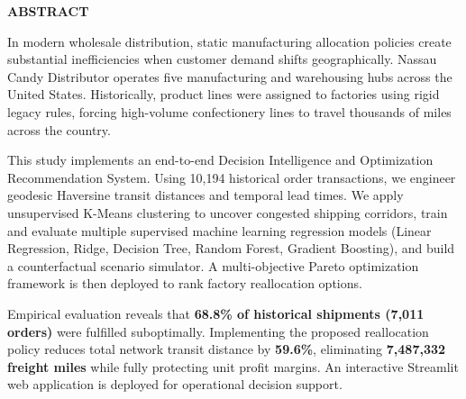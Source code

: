 \documentclass[12pt]{article}
\begin{document}
\newpage

\begin{center}
    {\fontsize{16}{20}\selectfont\bfseries ABSTRACT\par}
\end{center}
\vspace{0.5cm}

In modern wholesale distribution, static manufacturing allocation policies create substantial inefficiencies when customer demand shifts geographically. Nassau Candy Distributor operates five manufacturing and warehousing hubs across the United States. Historically, product lines were assigned to factories using rigid legacy rules, forcing high-volume confectionery lines to travel thousands of miles across the country.

This study implements an end-to-end Decision Intelligence and Optimization Recommendation System. Using 10,194 historical order transactions, we engineer geodesic Haversine transit distances and temporal lead times. We apply unsupervised K-Means clustering to uncover congested shipping corridors, train and evaluate multiple supervised machine learning regression models (Linear Regression, Ridge, Decision Tree, Random Forest, Gradient Boosting), and build a counterfactual scenario simulator. A multi-objective Pareto optimization framework is then deployed to rank factory reallocation options.

Empirical evaluation reveals that \textbf{68.8\% of historical shipments (7,011 orders)} were fulfilled suboptimally. Implementing the proposed reallocation policy reduces total network transit distance by \textbf{59.6\%}, eliminating \textbf{7,487,332 freight miles} while fully protecting unit profit margins. An interactive Streamlit web application is deployed for operational decision support.

\newpage

{
  \tableofcontents
  \newpage
  \listoftables
}

\newpage

\setcounter{page}{1}
\end{document}
